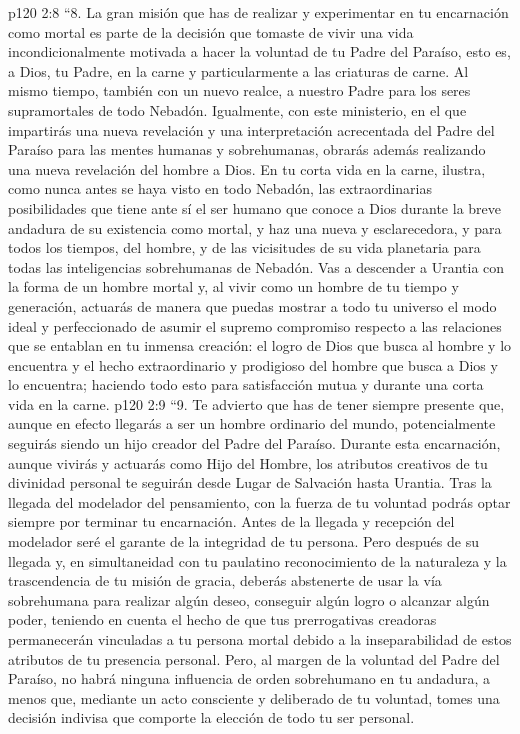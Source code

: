 \vs p120 2:8 \pc “8. La gran misión que has de realizar y experimentar en tu encarnación como mortal es parte de la decisión que tomaste de vivir una vida incondicionalmente motivada a hacer la voluntad de tu Padre del Paraíso, esto es,  a Dios, tu Padre, en la carne y particularmente a las criaturas de carne. Al mismo tiempo, también  con un nuevo realce, a nuestro Padre para los seres supramortales de todo Nebadón. Igualmente, con este ministerio, en el que impartirás una nueva revelación y una interpretación acrecentada del Padre del Paraíso para las mentes humanas y sobrehumanas, obrarás además realizando una nueva revelación del hombre a Dios. En tu corta vida en la carne, ilustra, como nunca antes se haya visto en todo Nebadón, las extraordinarias posibilidades que tiene ante sí el ser humano que conoce a Dios durante la breve andadura de su existencia como mortal, y haz una  nueva y esclarecedora, y para todos los tiempos, del hombre, y de las vicisitudes de su vida planetaria para todas las inteligencias sobrehumanas de Nebadón. Vas a descender a Urantia con la forma de un hombre mortal y, al vivir como un hombre de tu tiempo y generación, actuarás de manera que puedas mostrar a todo tu universo el modo ideal y perfeccionado de asumir el supremo compromiso respecto a las relaciones que se entablan en tu inmensa creación: el logro de Dios que busca al hombre y lo encuentra y el hecho extraordinario y prodigioso del hombre que busca a Dios y lo encuentra; haciendo todo esto para satisfacción mutua y durante una corta vida en la carne.
\vs p120 2:9 \pc “9. Te advierto que has de tener siempre presente que, aunque en efecto llegarás a ser un hombre ordinario del mundo, potencialmente seguirás siendo un hijo creador del Padre del Paraíso. Durante esta encarnación, aunque vivirás y actuarás como Hijo del Hombre, los atributos creativos de tu divinidad personal te seguirán desde Lugar de Salvación hasta Urantia. Tras la llegada del modelador del pensamiento, con la fuerza de tu voluntad podrás optar siempre por terminar tu encarnación. Antes de la llegada y recepción del modelador seré el garante de la integridad de tu persona. Pero después de su llegada y, en simultaneidad con tu paulatino reconocimiento de la naturaleza y la trascendencia de tu misión de gracia, deberás abstenerte de usar la vía sobrehumana para realizar algún deseo, conseguir algún logro o alcanzar algún poder, teniendo en cuenta el hecho de que tus prerrogativas creadoras permanecerán vinculadas a tu persona mortal debido a la inseparabilidad de estos atributos de tu presencia personal. Pero, al margen de la voluntad del Padre del Paraíso, no habrá ninguna influencia de orden sobrehumano en tu andadura, a menos que, mediante un acto consciente y deliberado de tu voluntad, tomes una decisión indivisa que comporte la elección de todo tu ser personal.
